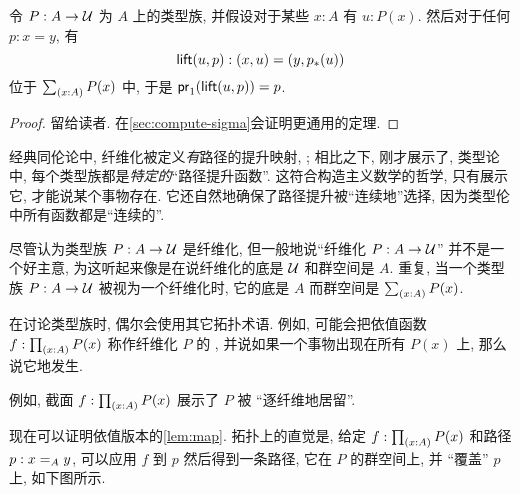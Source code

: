 \begin{lem}[路径提升性质]
    \label{thm:path-lifting}
    令 $P:A\to\type$ 为 $A$ 上的类型族, 并假设对于某些 $x:A$ 有 $u:P(x)$.
    然后对于任何 $p:x=y$, 有
    \begin{equation*}
        \mathsf{lift}(u,p):(x,u)=(y,\trans{p}{u})
    \end{equation*}
    位于 $\sm{x:A}P(x)$ 中, 于是 $\ap{\proj1}{\mathsf{lift}(u,p)} = p$.
\end{lem}
\begin{proof}
    留给读者.
    在\cref{sec:compute-sigma}会证明更通用的定理.
\end{proof}

经典同伦论中, 纤维化被定义\emph{有}路径的提升映射, ;
相比之下, 刚才展示了, 类型论中, 每个类型族都是\emph{特定的}``路径提升函数''.
这符合构造主义数学的哲学, 只有展示它, 才能说某个事物存在.
%
它还自然地确保了路径提升被``连续地''选择, 因为类型伦中所有函数都是``连续的''.

\begin{rmk}
    尽管认为类型族 $P:A\to \type$ 是纤维化, 但一般地说``纤维化 $P:A\to\type$'' 并不是一个好主意, 为这听起来像是在说纤维化的底是 $\type$ 和群空间是 $A$.
    重复, 当一个类型族 $P:A\to \type$ 被视为一个纤维化时, 它的底是 $A$ 而群空间是 $\sm{x:A} P(x)$.

    在讨论类型族时, 偶尔会使用其它拓扑术语.
    例如, 可能会把依值函数 $f:\prd{x:A} P(x)$ 称作纤维化 $P$ 的
    , 并说如果一个事物出现在所有 $P(x)$ 上, 那么说它地发生.

    例如, 截面 $f:\prd{x:A} P(x)$ 展示了 $P$ 被 ``逐纤维地居留''.
\end{rmk}

现在可以证明依值版本的\cref{lem:map}.
拓扑上的直觉是, 给定 $f:\prd{x:A} P(x)$ 和路径 $p:\id[A]xy$, 可以应用 $f$ 到 $p$ 然后得到一条路径, 它在 $P$ 的群空间上, 并 ``覆盖'' $p$ 上, 如下图所示.

\begin{center}
\end{center}

